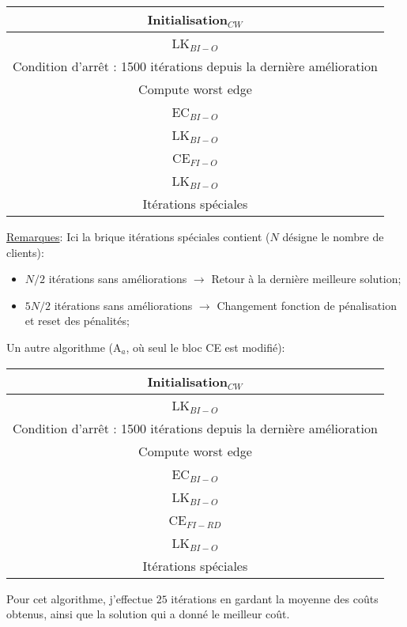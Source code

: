 \documentclass[a4paper,11pt]{article}%
\begin{document}
\begin{center}
\begin{tabular}{|c|}

   \hline
   Initialisation$_{CW}$  \\
   \hline
   LK$_{BI-O}$ \\
   \hline
   \hline
   Condition d'arrêt : 1500 itérations depuis la dernière amélioration  \\
   \hline
   Compute worst edge \\
   \hline
   EC$_{BI-O}$ \\
   \hline
   LK$_{BI-O}$ \\
   \hline
   CE$_{FI-O}$ \\
   \hline
   LK$_{BI-O}$ \\
   \hline
   Itérations spéciales \\
   \hline
   \hline
   
\end{tabular}
\end{center}

\underline{Remarques}: Ici la brique itérations spéciales contient ($N$ désigne le nombre de clients):
\begin{itemize}
\item $N/2$ itérations sans améliorations $\rightarrow$ Retour à la dernière meilleure solution;
\item $5N/2$ itérations sans améliorations $\rightarrow$ Changement fonction de pénalisation et reset des pénalités;
\end{itemize} 


Un autre algorithme (A$_a$, où seul le bloc CE est modifié):
\begin{center}
\begin{tabular}{|c|}

   \hline
   Initialisation$_{CW}$  \\
   \hline
   LK$_{BI-O}$ \\
   \hline
   \hline
   Condition d'arrêt : 1500 itérations depuis la dernière amélioration  \\
   \hline
   Compute worst edge \\
   \hline
   EC$_{BI-O}$ \\
   \hline
   LK$_{BI-O}$ \\
   \hline
   CE$_{FI-RD}$ \\
   \hline
   LK$_{BI-O}$ \\
   \hline
   Itérations spéciales \\
   \hline
   \hline
   
\end{tabular}
\end{center}

Pour cet algorithme, j'effectue $25$ itérations en gardant la moyenne des coûts obtenus, ainsi que la solution qui a donné le meilleur coût.

 
\end{document}
